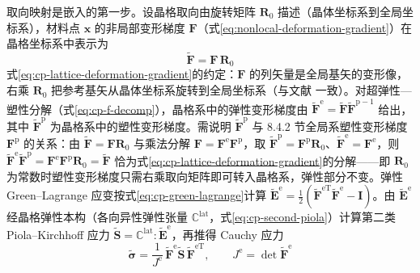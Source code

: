 取向映射是嵌入的第一步。设晶格取向由旋转矩阵 $\mathbf{R}_{0}$ 描述（晶体坐标系到全局坐标系），材料点 $\mathbf{x}$ 的非局部变形梯度 $\mathbf{F}$（式\eqref{eq:nonlocal-deformation-gradient}）在晶格坐标系中表示为
\begin{equation}
  \tilde{\mathbf{F}}=\mathbf{F}\,\mathbf{R}_{0}
  \label{eq:cp-lattice-deformation-gradient}
\end{equation}
式\eqref{eq:cp-lattice-deformation-gradient}的约定：$\mathbf{F}$ 的列矢量是全局基矢的变形像，右乘 $\mathbf{R}_{0}$ 把参考基矢从晶体坐标系旋转到全局坐标系（与文献 \cite{SunSundararaghavan2014,GuZhangMadenci2019} 一致）。对超弹性—塑性分解（式\eqref{eq:cp-f-decomp}），晶格系中的弹性变形梯度由 $\tilde{\mathbf{F}}^{\mathrm{e}}=\tilde{\mathbf{F}}\tilde{\mathbf{F}}^{\mathrm{p}-1}$ 给出，其中 $\tilde{\mathbf{F}}^{\mathrm{p}}$ 为晶格系中的塑性变形梯度。需说明 $\tilde{\mathbf{F}}^{\mathrm{p}}$ 与 8.4.2 节全局系塑性变形梯度 $\mathbf{F}^{\mathrm{p}}$ 的关系：由 $\tilde{\mathbf{F}}=\mathbf{F}\mathbf{R}_{0}$ 与乘法分解 $\mathbf{F}=\mathbf{F}^{\mathrm{e}}\mathbf{F}^{\mathrm{p}}$，取 $\tilde{\mathbf{F}}^{\mathrm{p}}=\mathbf{F}^{\mathrm{p}}\mathbf{R}_{0}$、$\tilde{\mathbf{F}}^{\mathrm{e}}=\mathbf{F}^{\mathrm{e}}$，则 $\tilde{\mathbf{F}}^{\mathrm{e}}\tilde{\mathbf{F}}^{\mathrm{p}}=\mathbf{F}^{\mathrm{e}}\mathbf{F}^{\mathrm{p}}\mathbf{R}_{0}=\tilde{\mathbf{F}}$ 恰为式\eqref{eq:cp-lattice-deformation-gradient}的分解——即 $\mathbf{R}_{0}$ 为常数时塑性变形梯度只需右乘取向矩阵即可转入晶格系，弹性部分不变。弹性 Green--Lagrange 应变按式\eqref{eq:cp-green-lagrange}计算 $\tilde{\mathbf{E}}^{\mathrm{e}}=\tfrac{1}{2}(\tilde{\mathbf{F}}^{\mathrm{eT}}\tilde{\mathbf{F}}^{\mathrm{e}}-\mathbf{I})$。由 $\tilde{\mathbf{E}}^{\mathrm{e}}$ 经晶格弹性本构（各向异性弹性张量 $\mathbb{C}^{\mathrm{lat}}$，式\eqref{eq:cp-second-piola}）计算第二类 Piola--Kirchhoff 应力 $\tilde{\mathbf{S}}=\mathbb{C}^{\mathrm{lat}}:\tilde{\mathbf{E}}^{\mathrm{e}}$，再推得 Cauchy 应力
\begin{equation}
  \tilde{\boldsymbol{\sigma}}=\frac{1}{J^{\mathrm{e}}}\,\tilde{\mathbf{F}}^{\mathrm{e}}
  \tilde{\mathbf{S}}\,\tilde{\mathbf{F}}^{\mathrm{eT}},\qquad
  J^{\mathrm{e}}=\det\tilde{\mathbf{F}}^{\mathrm{e}}
  \label{eq:cp-cauchy-lattice}
\end{equation}
